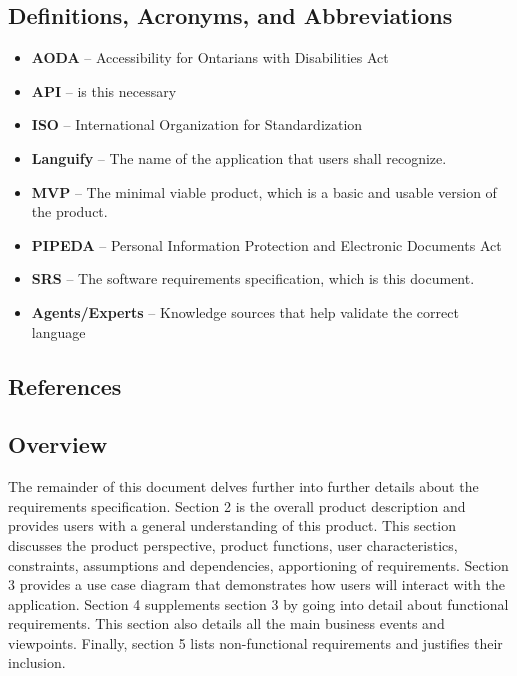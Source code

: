 \subsection{Definitions, Acronyms, and Abbreviations}
\label{sub:definitions_acronyms_and_abbreviations}
\begin{itemize}
	\item \textbf{AODA} – Accessibility for Ontarians with Disabilities Act
	\item \textbf{API} – is this necessary
	\item \textbf{ISO} – International Organization for Standardization
	\item \textbf{Languify} – The name of the application that users shall recognize.
	\item \textbf{MVP} – The minimal viable product, which is a basic and usable version of the product. 
	\item \textbf{PIPEDA} – Personal Information Protection and Electronic Documents Act
	\item \textbf{SRS} – The software requirements specification, which is this document.
	\item \textbf{Agents/Experts} – Knowledge sources that help validate the correct language
\end{itemize}


\subsection{References}
\label{sub:references}




\subsection{Overview}
\label{sub:overview}
The remainder of this document delves further into further details about the requirements specification. Section 2 is the overall product description and provides users with a general understanding of this product. This section discusses the product perspective, product functions, user characteristics, constraints, assumptions and dependencies, apportioning of requirements. Section 3 provides a use case diagram that demonstrates how users will interact with the application. Section 4 supplements section 3 by going into detail about functional requirements. This section also details all the main business events and viewpoints. Finally, section 5 lists non-functional requirements and justifies their inclusion.

